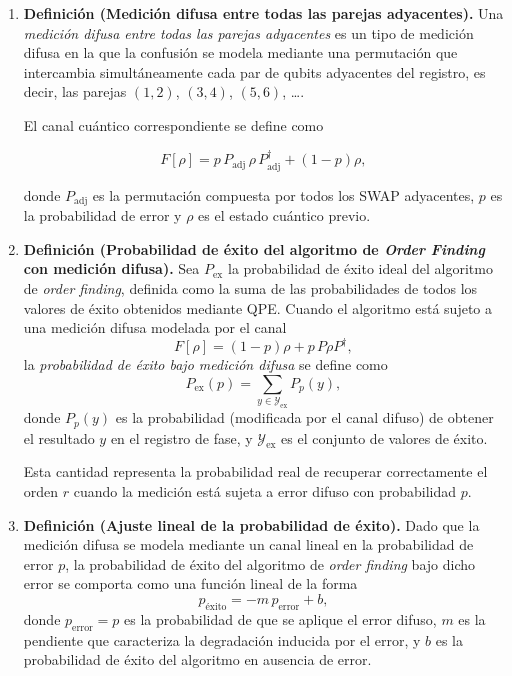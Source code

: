 \documentclass[letterpaper]{article}
\begin{document}
\begin{enumerate}
El canal cuántico correspondiente se define como

\[
F[\rho] = p\, P_{\mathrm{circ},k}\, \rho\, P_{\mathrm{circ},k}^\dagger + (1-p)\rho,
\]

donde $P_{\mathrm{circ},k}$ es la permutación circular de $k$ posiciones, $p$ es la probabilidad de error y $\rho$ es el estado cuántico previo.

\item\textbf{Definición (Medición difusa entre todas las parejas adyacentes).} Una \emph{medición difusa entre todas las parejas adyacentes} es un tipo de medición difusa en la que la confusión se modela mediante una permutación que intercambia simultáneamente cada par de qubits adyacentes del registro, es decir, las parejas $(1,2)$, $(3,4)$, $(5,6)$, \ldots.

El canal cuántico correspondiente se define como

\[
F[\rho] = p\, P_{\mathrm{adj}}\, \rho\, P_{\mathrm{adj}}^\dagger + (1-p)\rho,
\]

donde $P_{\mathrm{adj}}$ es la permutación compuesta por todos los SWAP adyacentes, $p$ es la probabilidad de error y $\rho$ es el estado cuántico previo.

\item \textbf{Definición (Probabilidad de éxito del algoritmo de \emph{Order Finding} con medición difusa).}
Sea $P_{\mathrm{ex}}$ la probabilidad de éxito ideal del algoritmo de \emph{order finding}, definida como la suma de las probabilidades de todos los valores de éxito obtenidos mediante QPE. Cuando el algoritmo está sujeto a una medición difusa modelada por el canal
\[
F[\rho] = (1-p)\rho + p\,P\rho P^\dagger,
\]
la \emph{probabilidad de éxito bajo medición difusa} se define como
\[
P_{\mathrm{ex}}(p) = \sum_{y \in \mathcal{Y}_{\mathrm{ex}}} P_p(y),
\]
donde $P_p(y)$ es la probabilidad (modificada por el canal difuso) de obtener el resultado $y$ en el registro de fase, y $\mathcal{Y}_{\mathrm{ex}}$ es el conjunto de valores de éxito.

Esta cantidad representa la probabilidad real de recuperar correctamente el orden $r$ cuando la medición está sujeta a error difuso con probabilidad $p$.


\item \textbf{Definición (Ajuste lineal de la probabilidad de éxito).}
Dado que la medición difusa se modela mediante un canal lineal en la probabilidad de error $p$, la probabilidad de éxito del algoritmo de \emph{order finding} bajo dicho error se comporta como una función lineal de la forma
\[
p_{\mathrm{éxito}} = -m\,p_{\mathrm{error}} + b,
\]
donde $p_{\mathrm{error}} = p$ es la probabilidad de que se aplique el error difuso, $m$ es la pendiente que caracteriza la degradación inducida por el error, y $b$ es la probabilidad de éxito del algoritmo en ausencia de error.


\end{enumerate}
\end{document}
